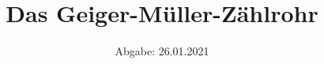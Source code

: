 

\subject{D703}
\title{Das Geiger-Müller-Zählrohr}
\date{
    Abgabe: 26.01.2021
}



\maketitle
\thispagestyle{empty}
\tableofcontents
\newpage


\newpage


\newpage


\newpage


\newpage

\printbibliography


